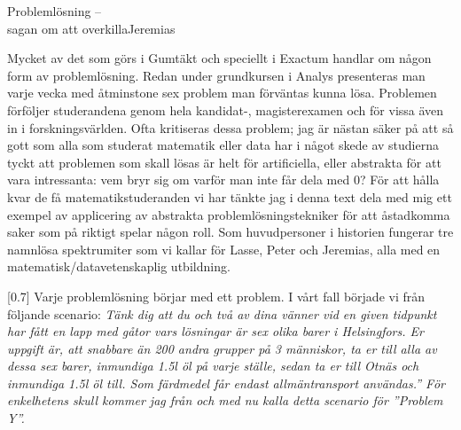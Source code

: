 \documentclass{spektraklet}
\begin{document}
\begin{artikel}{Problemlösning – \\ sagan om att overkilla}{Jeremias}
\begin{twocolumns}
  Mycket av det som görs i Gumtäkt och speciellt i Exactum handlar om någon form av problemlösning. Redan under grundkursen i Analys presenteras man varje vecka med åtminstone sex problem man förväntas kunna lösa. Problemen förföljer studerandena genom hela kandidat-,  magisterexamen och för vissa även in i forskningsvärlden. Ofta kritiseras dessa problem; jag är nästan säker på att så gott som alla som studerat matematik eller data har i något skede av studierna tyckt att problemen som skall lösas är helt för artificiella, eller abstrakta för att vara intressanta: vem bryr sig om varför man inte får dela med $ 0$? För att hålla kvar de få matematikstuderanden vi har tänkte jag i denna text dela med mig ett exempel av applicering av abstrakta problemlösningstekniker för att åstadkomma saker som på riktigt spelar någon roll. Som huvudpersoner i historien fungerar tre namnlösa spektrumiter som vi kallar för Lasse, Peter och Jeremias, alla med en matematisk/datavetenskaplig utbildning.

  [0.7\columnwidth]
  Varje problemlösning börjar med ett problem. I vårt fall började vi från följande scenario:
  \textit{Tänk dig att du och två av dina vänner vid en given tidpunkt har fått en lapp med gåtor vars lösningar är sex olika barer i Helsingfors. Er uppgift är, att snabbare än 200 andra grupper på 3 människor, ta er till alla av dessa sex barer, inmundiga 1.5l öl på varje ställe, sedan ta er till Otnäs och inmundiga 1.5l öl till. Som färdmedel får endast allmäntransport användas.” För enkelhetens skull kommer jag från och med nu kalla detta scenario för ''Problem Y''.}


\end{twocolumns}
\end{artikel}
\end{document}
